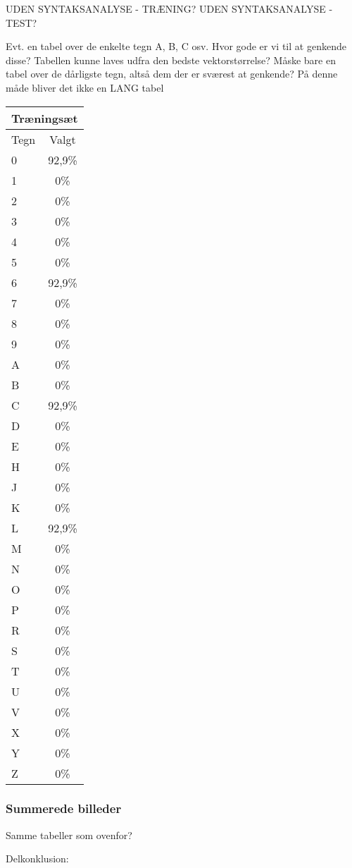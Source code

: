 UDEN SYNTAKSANALYSE - TRÆNING?
UDEN SYNTAKSANALYSE - TEST?

Evt. en tabel over de enkelte tegn A, B, C osv. Hvor gode er vi til at genkende disse? Tabellen kunne laves udfra den bedste vektorstørrelse? Måske bare en tabel over de dårligste tegn, altså dem der er sværest at genkende? På denne måde bliver det ikke en LANG tabel

\begin{tabular}{|l|c|}\hline
\multicolumn{2}{|l|}{Træningsæt} \\\hline
Tegn & Valgt \\\hline
0 & 92,9\% \\\hline
1 & 0\% \\\hline
2 & 0\% \\\hline
3 & 0\% \\\hline
4 & 0\% \\\hline
5 & 0\% \\\hline
6 & 92,9\% \\\hline
7 & 0\% \\\hline
8 & 0\% \\\hline
9 & 0\% \\\hline
A & 0\% \\\hline
B & 0\% \\\hline
C & 92,9\% \\\hline
D & 0\% \\\hline
E & 0\% \\\hline
H & 0\% \\\hline
J & 0\% \\\hline
K & 0\% \\\hline 
L & 92,9\% \\\hline
M & 0\% \\\hline
N & 0\% \\\hline
O & 0\% \\\hline
P & 0\% \\\hline
R & 0\% \\\hline
S & 0\% \\\hline
T & 0\% \\\hline
U & 0\% \\\hline
V & 0\% \\\hline
X & 0\% \\\hline
Y & 0\% \\\hline
Z & 0\% \\\hline \end{tabular}



\subsubsection{Summerede billeder}
Samme tabeller som ovenfor?



Delkonklusion:


